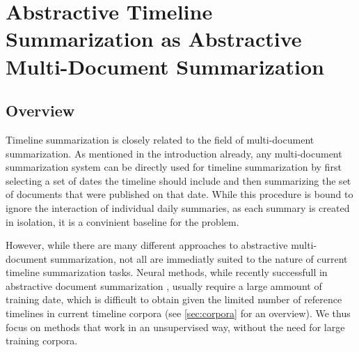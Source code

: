 \documentclass[a4paper,BCOR=10mm]{report}
\numberwithin{lemma}{chapter}
\numberwithin{definition}{chapter}
\begin{document}









\chapter{Abstractive Timeline Summarization as Abstractive Multi-Document Summarization} \label{sec:baseline}

\section{Overview}

Timeline summarization is closely related to the field of multi-document summarization. As mentioned in the introduction already, any multi-document summarization system can be directly used for timeline summarization by first selecting a set of dates the timeline should include and then summarizing the set of documents that were published on that date.
While this procedure is bound to ignore the interaction of individual daily summaries, as each summary is created in isolation, it is a convinient baseline for the problem.

However, while there are many different approaches to abstractive multi-document summarization, not all are immediatly suited to the nature of current timeline summarization tasks. Neural methods, while recently successfull in abstractive document summarization \citep{paulus}, usually require a large ammount of training date, which is difficult to obtain given the limited number of reference timelines in current timeline corpora (see \ref{sec:corpora} for an overview).
We thus focus on methods that work in an unsupervised way, without the need for large training corpora.
\end{document}
